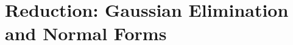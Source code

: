 %
%
%

\newpage
\section{Reduction: Gaussian Elimination and Normal Forms}
\label{sec:rank-normal-form}

